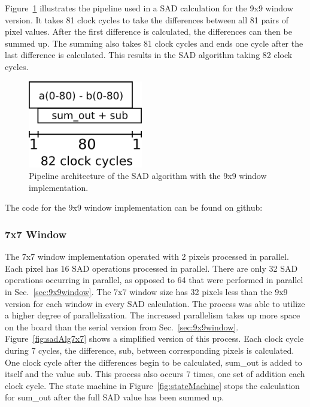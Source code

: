 Figure~\ref{fig:sadPipe9x9} illustrates the pipeline used in a SAD calculation for the 9x9 window version. It takes 81 clock cycles to take the differences between all 81 pairs of pixel values. After the first difference is calculated, the differences can then be summed up. The summing also takes 81 clock cycles and ends one cycle after the last difference is calculated. This results in the SAD algorithm taking 82 clock cycles.

\begin{figure}
	\begin{center}
		\includegraphics[width=50mm]{figures/sadPipeline9x9.png}
		\captionfonts
		\caption{Pipeline architecture of the SAD algorithm with the 9x9 window implementation.}
		\label{fig:sadPipe9x9}
	\end{center}
\end{figure}

The code for the 9x9 window implementation can be found on github:
\\\sloppy{}

\subsubsection{7x7 Window}
\label{sec:7x7window}

The 7x7 window implementation operated with 2 pixels processed in parallel. Each pixel has 16 SAD operations processed in parallel. There are only 32 SAD operations occurring in parallel, as opposed to 64 that were performed in parallel in Sec.~\ref{sec:9x9window}. The 7x7 window size has 32 pixels less than the 9x9 version for each window in every SAD calculation. The process was able to utilize a higher degree of parallelization. The increased parallelism takes up more space on the board than the serial version from Sec.~\ref{sec:9x9window}. Figure~\ref{fig:sadAlg7x7} shows a simplified version of this process. Each clock cycle during 7 cycles, the difference, sub, between corresponding pixels is calculated. One clock cycle after the differences begin to be calculated, sum\_out is added to itself and the value sub. This process also occurs 7 times, one set of addition each clock cycle. The state machine in Figure~\ref{fig:stateMachine} stops the calculation for sum\_out after the full SAD value has been summed up.

